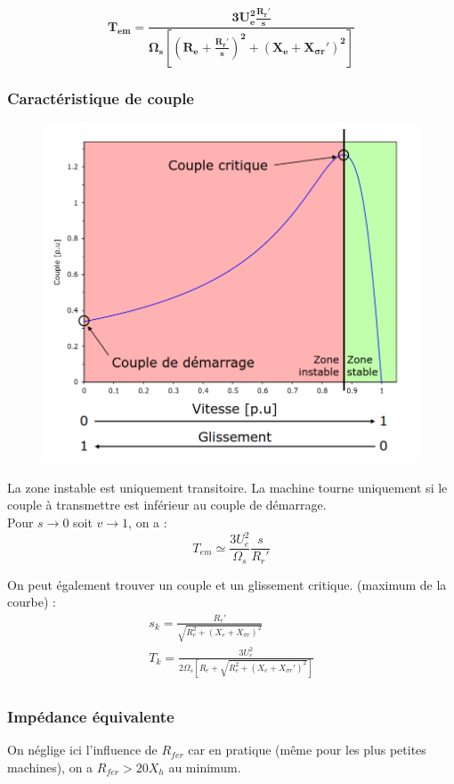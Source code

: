 \documentclass[../main.tex]{subfiles}
\begin{document}
\begin{equation}
    \mathbf{T_{em} = \frac{3 U_e^2 \frac{R_r'}{s}}{\Omega_s [(R_e + \frac{R_r'}{s})^2 + (X_e + X_{\sigma r}')^2]}}
\end{equation}

\subsubsection{Caractéristique de couple}
\begin{figure}[hbt!]
    \centering
    \includegraphics[width=.5\textwidth]{IMAGES/machineelec/couple.png}
\end{figure}

La zone instable est uniquement transitoire. La machine tourne uniquement si le couple à transmettre est inférieur au couple de démarrage.\\

Pour $s\rightarrow 0$ soit $v\rightarrow 1$, on a : \begin{equation}
    T_{em} \simeq \frac{3 U_e^2}{\Omega_s} \frac{s}{R_r'}
\end{equation}

On peut également trouver un couple et un glissement critique. (maximum de la courbe) : \begin{equation}
    \begin{gathered}
        s_k = \frac{R_r'}{\sqrt{R_e^2 + (X_e + X_{\sigma r})^2}}\\
        T_k = \frac{3U_e^2}{2\Omega_s [R_e + \sqrt{R_e^2 + (X_e + X_{\sigma r}')^2}]}\\
    \end{gathered}
\end{equation}

\subsubsection{Impédance équivalente}
On néglige ici l'influence de $R_{fer}$ car en pratique (même pour les plus petites machines), on a $R_{fer} > 20 X_h$ au minimum. \\
\end{document}

